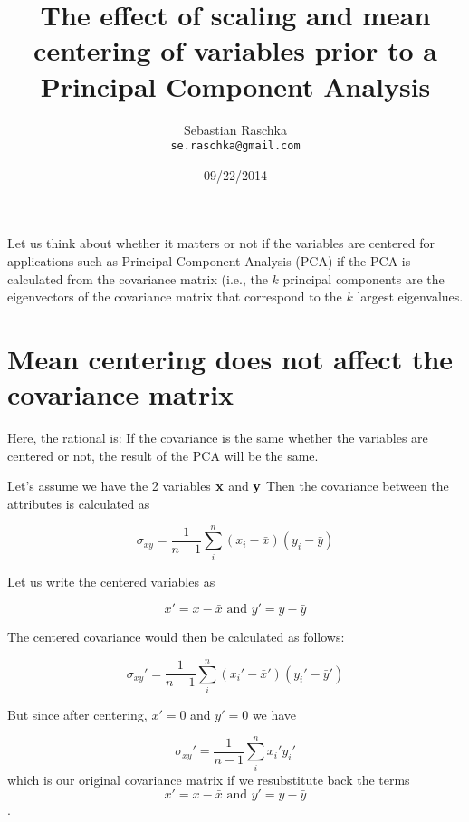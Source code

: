 \documentclass[fleqn]{article}
\title{The effect of scaling and mean centering of variables prior to a Principal Component Analysis}
\author{Sebastian Raschka\\ \texttt{se.raschka@gmail.com}}
\date{09\slash 22\slash 2014}
\begin{document}

\maketitle %


Let us think about whether it matters or not if the variables are centered for applications such as Principal Component Analysis (PCA) if the PCA is calculated from the covariance matrix (i.e., the $k$ principal components are the eigenvectors of the covariance matrix that correspond to the $k$ largest eigenvalues.



\section{Mean centering does not affect the covariance matrix}
\label{meancenteringdoesnotaffectthecovariancematrix}

Here, the rational is: If the covariance is the same whether the variables are centered or not, the result of the PCA will be the same.

Let's assume we have the 2 variables $\bf{x}$ and $\bf{y}$ Then the covariance between the attributes is calculated as

\begin{equation} \sigma_{xy} = \frac{1}{n-1} \sum_{i}^{n} (x_i - \bar{x})(y_i - \bar{y})   \end{equation}

Let us write the centered variables as 

\begin{equation} x' = x - \bar{x} \text{ and } y' = y - \bar{y} \end{equation}

The centered covariance would then be calculated as follows:

\begin{equation} \sigma_{xy}' = \frac{1}{n-1} \sum_{i}^{n} (x_i' - \bar{x}')(y_i' - \bar{y}')   \end{equation}

But since after centering, $\bar{x}' = 0$ and $\bar{y}' = 0$ we have 

\begin{equation} \sigma_{xy}' = \frac{1}{n-1} \sum_{i}^{n} x_i' y_i'   \end{equation} which is our original covariance matrix if we resubstitute back the terms
\begin{equation} x' = x - \bar{x} \text{ and } y' = y - \bar{y} \end{equation}.
\end{document}
